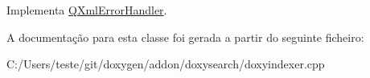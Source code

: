 Implementa \hyperlink{class_q_xml_error_handler_a109de9b8833092a63f6bc48f84cf241b}{Q\-Xml\-Error\-Handler}.



A documentação para esta classe foi gerada a partir do seguinte ficheiro\-:\begin{DoxyCompactItemize}
\item 
C\-:/\-Users/teste/git/doxygen/addon/doxysearch/doxyindexer.\-cpp\end{DoxyCompactItemize}
